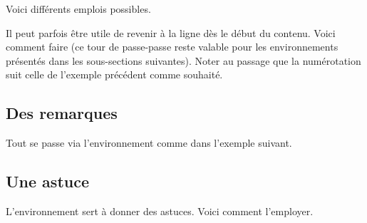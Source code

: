 Voici différents emplois possibles.









\begin{bdoctip}
    Il peut parfois être utile de revenir à la ligne dès le début du contenu. Voici comment faire (ce tour de passe-passe reste valable pour les environnements présentés dans les sous-sections suivantes). Noter au passage que la numérotation suit celle de l'exemple précédent comme souhaité.

\end{bdoctip}



\subsection{Des remarques}

Tout se passe via l'environnement  comme dans l'exemple suivant.




\subsection{Une astuce}

L'environnement  sert à donner des astuces. Voici comment l'employer.



